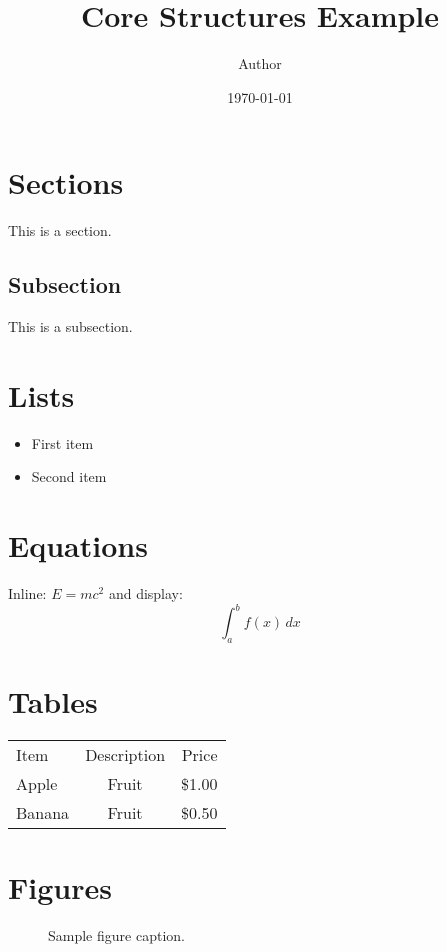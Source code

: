 \documentclass{article}
\begin{document}
\title{Core Structures Example}
\author{Author}
\date{\today}
\maketitle

\section{Sections}
This is a section.

\subsection{Subsection}
This is a subsection.

\section{Lists}
\begin{itemize}
   \item First item
   \item Second item
\end{itemize}

\section{Equations}
Inline: $E=mc^2$ \quad and display:
\[
\int_a^b f(x)\,dx
\]

\section{Tables}
\begin{tabular}{lcr}
Item & Description & Price\\
Apple & Fruit & \$1.00\\
Banana & Fruit & \$0.50\\
\end{tabular}

\section{Figures}
\begin{figure}[h]
\centering
\caption{Sample figure caption.}
\end{figure}
\end{document}
